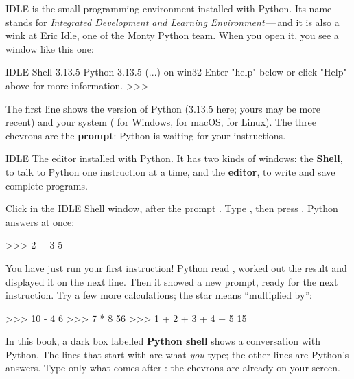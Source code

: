 IDLE is the small programming environment installed with Python. Its name stands for
\emph{Integrated Development and Learning Environment}\,---\,and it is also a wink at Eric Idle, one
of the Monty Python team. When you open it, you see a window like this one:

\begin{idleshell}{IDLE Shell 3.13.5}
Python 3.13.5 (...) on win32
Enter "help" below or click "Help" above for more information.
>>>
\end{idleshell}

The first line shows the version of Python (3.13.5 here; yours may be more recent) and your system
( for Windows,  for macOS,  for Linux). The three chevrons
\py{>>>} are the \textbf{prompt}: Python is waiting for your instructions.

\begin{definition}{IDLE}
The editor installed with Python. It has two kinds of windows: the \textbf{Shell}, to talk to Python
one instruction at a time, and the \textbf{editor}, to write and save complete programs.
\end{definition}


Click in the IDLE Shell window, after the prompt \py{>>>}. Type , then press
. Python answers at once:

\begin{console}
>>> 2 + 3
5
\end{console}

You have just run your first instruction! Python read , worked out the result and
displayed it on the next line. Then it showed a new prompt, ready for the next instruction. Try a
few more calculations; the star \py{*} means \enquote{multiplied by}:

\begin{console}
>>> 10 - 4
6
>>> 7 * 8
56
>>> 1 + 2 + 3 + 4 + 5
15
\end{console}

\begin{regle}
In this book, a dark box labelled \textbf{Python shell} shows a conversation with Python. The lines
that start with \py{>>>} are what \emph{you} type; the other lines are Python's answers. Type only
what comes after \py{>>>}: the chevrons are already on your screen.
\end{regle}


